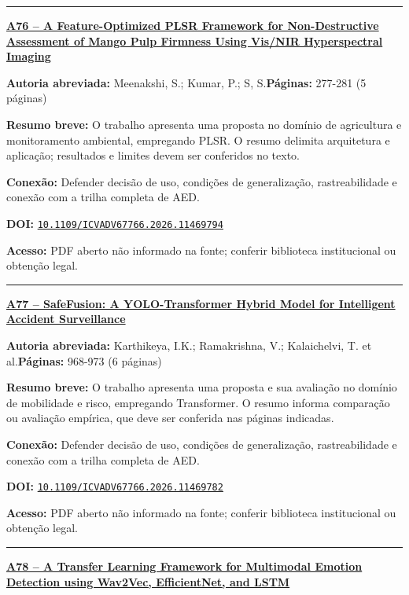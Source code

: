 \documentclass[10pt,a4paper]{article}
\begin{document}
\noindent\rule{\textwidth}{0.35pt}
\par\medskip\noindent
{\large\bfseries\href{https://doi.org/10.1109/ICVADV67766.2026.11469794}{A76 -- A Feature-Optimized PLSR Framework for Non-Destructive Assessment of Mango Pulp Firmness Using Vis/NIR Hyperspectral Imaging}}\par\smallskip
\textbf{Autoria abreviada:} Meenakshi, S.; Kumar, P.; S, S.\quad \textbf{Páginas:} 277-281 (5 páginas)\par
\textbf{Resumo breve:} O trabalho apresenta uma proposta no domínio de agricultura e monitoramento ambiental, empregando PLSR. O resumo delimita arquitetura e aplicação; resultados e limites devem ser conferidos no texto.\par
\textbf{Conexão:} Defender decisão de uso, condições de generalização, rastreabilidade e conexão com a trilha completa de AED.\par
\textbf{DOI:} \href{https://doi.org/10.1109/ICVADV67766.2026.11469794}{\nolinkurl{10.1109/ICVADV67766.2026.11469794}}\par
\textbf{Acesso:} PDF aberto não informado na fonte; conferir biblioteca institucional ou obtenção legal.\par
\noindent\rule{\textwidth}{0.35pt}
\par\medskip\noindent
{\large\bfseries\href{https://doi.org/10.1109/ICVADV67766.2026.11469782}{A77 -- SafeFusion: A YOLO-Transformer Hybrid Model for Intelligent Accident Surveillance}}\par\smallskip
\textbf{Autoria abreviada:} Karthikeya, I.K.; Ramakrishna, V.; Kalaichelvi, T. et al.\quad \textbf{Páginas:} 968-973 (6 páginas)\par
\textbf{Resumo breve:} O trabalho apresenta uma proposta e sua avaliação no domínio de mobilidade e risco, empregando Transformer. O resumo informa comparação ou avaliação empírica, que deve ser conferida nas páginas indicadas.\par
\textbf{Conexão:} Defender decisão de uso, condições de generalização, rastreabilidade e conexão com a trilha completa de AED.\par
\textbf{DOI:} \href{https://doi.org/10.1109/ICVADV67766.2026.11469782}{\nolinkurl{10.1109/ICVADV67766.2026.11469782}}\par
\textbf{Acesso:} PDF aberto não informado na fonte; conferir biblioteca institucional ou obtenção legal.\par
\noindent\rule{\textwidth}{0.35pt}
\par\medskip\noindent
{\large\bfseries\href{https://doi.org/10.1109/ICVADV67766.2026.11470451}{A78 -- A Transfer Learning Framework for Multimodal Emotion Detection using Wav2Vec, EfficientNet, and LSTM}}\par\smallskip
\end{document}
